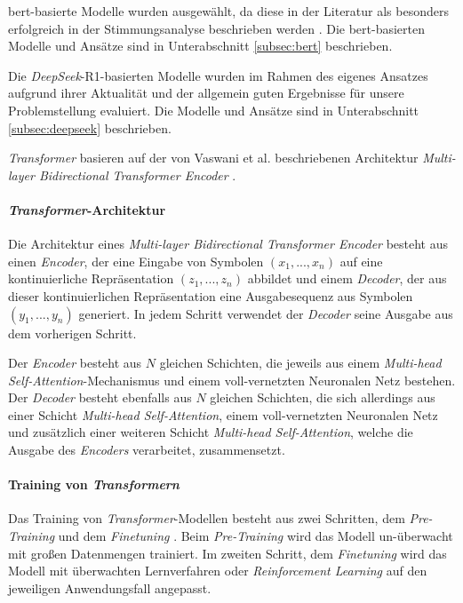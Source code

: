 \gls{bert}-basierte Modelle wurden ausgewählt, da diese in der Literatur als besonders erfolgreich in der Stimmungsanalyse beschrieben werden \cite{devlin2018bert}.
Die \gls{bert}-basierten Modelle und Ansätze sind in Unterabschnitt \ref{subsec:bert} beschrieben.

Die \textit{DeepSeek}-R1-basierten Modelle wurden im Rahmen des eigenes Ansatzes aufgrund ihrer Aktualität und der allgemein guten Ergebnisse für unsere Problemstellung evaluiert.
Die Modelle und Ansätze sind in Unterabschnitt \ref{subsec:deepseek} beschrieben.

\textit{Transformer} basieren auf der von Vaswani et al. beschriebenen Architektur \textit{Multi-layer Bidirectional Transformer Encoder} \cite{vaswani2017attention}.

\paragraph{\textit{Transformer}-Architektur}
Die Architektur eines \textit{Multi-layer Bidirectional Transformer Encoder} besteht aus einen \textit{Encoder}, der eine Eingabe von Symbolen $(x_1,...,x_n)$ auf eine kontinuierliche Repräsentation $(z_1,...,z_n)$ abbildet und einem \textit{Decoder}, der aus dieser kontinuierlichen Repräsentation eine Ausgabesequenz aus Symbolen $(y_1,...,y_n)$ generiert.
In jedem Schritt verwendet der \textit{Decoder} seine Ausgabe aus dem vorherigen Schritt.

Der \textit{Encoder} besteht aus $N$ gleichen Schichten, die jeweils aus einem \textit{Multi-head Self-Attention}-Mechanismus und einem voll-vernetzten Neuronalen Netz bestehen.
Der \textit{Decoder} besteht ebenfalls aus $N$ gleichen Schichten, die sich allerdings aus einer Schicht \textit{Multi-head Self-Attention}, einem voll-vernetzten Neuronalen Netz und zusätzlich einer weiteren Schicht \textit{Multi-head Self-Attention}, welche die Ausgabe des \textit{Encoders} verarbeitet, zusammensetzt.

\paragraph{Training von \textit{Transformern}}

Das Training von \textit{Transformer}-Modellen besteht aus zwei Schritten, dem \textit{Pre-Training} und dem \textit{Finetuning} \cite{Radford2018ImprovingLU}.
Beim \textit{Pre-Training} wird das Modell un-überwacht mit großen Datenmengen trainiert.
Im zweiten Schritt, dem \textit{Finetuning} wird das Modell mit überwachten Lernverfahren oder \textit{Reinforcement Learning} \cite{deepseekai2025deepseekr1incentivizingreasoningcapability, devlin2018bert} auf den jeweiligen Anwendungsfall angepasst.


